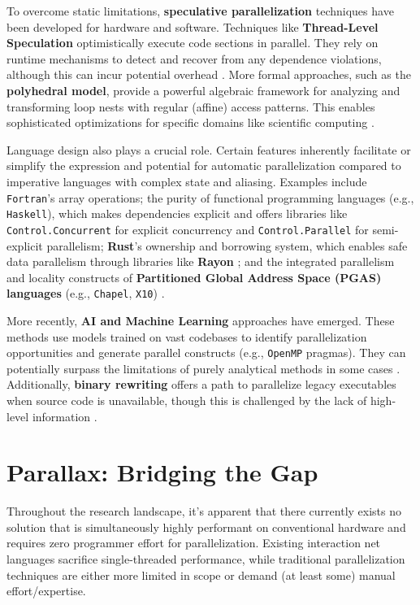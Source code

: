 To overcome static limitations, \textbf{speculative parallelization} techniques have been developed for hardware and software. Techniques like \textbf{Thread-Level Speculation} optimistically execute code sections in parallel. They rely on runtime mechanisms to detect and recover from any dependence violations, although this can incur potential overhead \cite{Rauchwerger1995RunTime}. More formal approaches, such as the \textbf{polyhedral model}, provide a powerful algebraic framework for analyzing and transforming loop nests with regular (affine) access patterns. This enables sophisticated optimizations for specific domains like scientific computing \cite{Bondhugula2008AutomaticDistributedMemory}.

Language design also plays a crucial role. Certain features inherently facilitate or simplify the expression and potential for automatic parallelization compared to imperative languages with complex state and aliasing. Examples include \texttt{Fortran}'s array operations; the purity of functional programming languages (e.g., \texttt{Haskell}), which makes dependencies explicit \cite{Hammond1996ParallelFunctional} and offers libraries like \texttt{Control.Concurrent} for explicit concurrency and \texttt{Control.Parallel} for semi-explicit parallelism; \textbf{Rust}'s ownership and borrowing system, which enables safe data parallelism through libraries like \textbf{Rayon} \cite{Rayon}; and the integrated parallelism and locality constructs of \textbf{Partitioned Global Address Space (PGAS) languages} (e.g., \texttt{Chapel}, \texttt{X10}) \cite{Yelick2007ProductivityParallel}.

More recently, \textbf{AI and Machine Learning} approaches have emerged. These methods use models trained on vast codebases to identify parallelization opportunities and generate parallel constructs (e.g., \texttt{OpenMP} pragmas). They can potentially surpass the limitations of purely analytical methods in some cases \cite{OMPar}. Additionally, \textbf{binary rewriting} offers a path to parallelize legacy executables when source code is unavailable, though this is challenged by the lack of high-level information \cite{Amaral2006AutomaticBinary}.


\section{Parallax: Bridging the Gap}

Throughout the research landscape, it's apparent that there currently exists no solution that is simultaneously highly performant on conventional hardware and requires zero programmer effort for parallelization. Existing interaction net languages sacrifice single-threaded performance, while traditional parallelization techniques are either more limited in scope or demand (at least some) manual effort/expertise.

